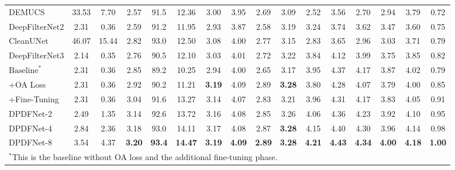 \documentclass[final,5p,times,authoryear]{elsarticle}
\begin{document}
\begin{table}
\begin{tabular}{lccccccccccccccc}
    DEMUCS & 33.53 & 7.70 & 2.57 & 91.5 & 12.36 & 3.00 & 3.95 & 2.69 & 3.09 & 2.52 & 3.56 & 2.70 & 2.94 & 3.79 & \cellcolor{prismblue}0.72 \\
    DeepFilterNet2 & 2.31 & 0.36 & 2.59 & 91.2 & 11.95 & 2.93 & 3.87 & 2.58 & 3.19 & 3.24 & 3.74 & 3.62 & 3.47 & 3.60 & \cellcolor{prismblue}0.75 \\
    CleanUNet & 46.07 & 15.44 & 2.82 & 93.0 & 12.50 & 3.08 & 4.00 & 2.77 & 3.15 & 2.83 & 3.65 & 2.96 & 3.03 & 3.71 & \cellcolor{prismblue}0.79 \\
    DeepFilterNet3 & 2.14 & 0.35 & 2.76 & 90.5 & 12.10 & 3.03 & 4.01 & 2.72 & 3.22 & 3.84 & 4.12 & 3.99 & 3.75 & 3.85 & \cellcolor{prismblue}0.82 \\
    \midrule
    $\text{Baseline}^*$ & 2.31 & 0.36 & 2.85 & 89.2 & 10.25 & 2.94 & 4.00 & 2.65 & 3.17 & 3.95 & 4.37 & 4.17 & 3.87 & 4.02 & \cellcolor{prismblue}0.79 \\
    \hspace{1em}+OA Loss & 2.31 & 0.36 & 2.92 & 90.2 & 11.21 & \textbf{3.19} & 4.09 & 2.89 & \textbf{3.28} & 3.80 & 4.28 & 4.07 & 3.79 & 4.00 & \cellcolor{prismblue}0.85 \\
    \hspace{2em}+Fine-Tuning & 2.31 & 0.36 & 3.04 & 91.6 & 13.27 & 3.14 & 4.07 & 2.83 & 3.21 & 3.96 & 4.31 & 4.17 & 3.83 & 4.05 & \cellcolor{prismblue}0.91 \\
    DPDFNet-2 & 2.49 & 1.35 & 3.14 & 92.6 & 13.72 & 3.16 & 4.08 & 2.85 & 3.26 & 4.06 & 4.36 & 4.23 & 3.92 & 4.10 & \cellcolor{prismblue}0.95 \\
    DPDFNet-4 & 2.84 & 2.36 & 3.18 & 93.0 & 14.11 & 3.17 & 4.08 & 2.87 & \textbf{3.28} & 4.15 & 4.40 & 4.30 & 3.96 & 4.14 & \cellcolor{prismblue}0.98 \\
    DPDFNet-8 & 3.54 & 4.37 & \textbf{3.20} & \textbf{93.4} & \textbf{14.47} & \textbf{3.19} & \textbf{4.09} & \textbf{2.89} & \textbf{3.28} & \textbf{4.21} & \textbf{4.43} & \textbf{4.34} & \textbf{4.00} & \textbf{4.18} & \cellcolor{prismblue}\textbf{1.00} \\
    \bottomrule
    \multicolumn{16}{l}{$^*$This is the baseline without OA loss and the additional fine-tuning phase.}
    \end{tabular}
    \label{tab:overall_results}
\end{table}
\end{document}
